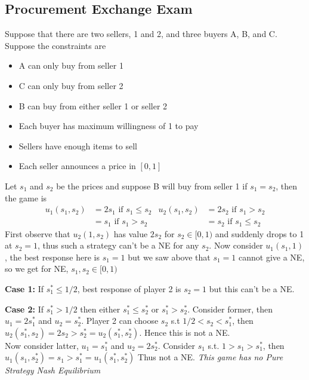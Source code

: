 \documentclass{article}
\theoremstyle{definition}
\begin{document}
\subsection{Procurement Exchange Exam}
Suppose that there are two sellers, 1 and 2, and three buyers A, B, and C. Suppose the constraints are
\begin{itemize}
	\item A can only buy from seller 1
	\item C can only buy from seller 2
	\item B can buy from either seller 1 or seller 2
	\item Each buyer has maximum willingness of 1 to pay
	\item Sellers have enough items to sell
	\item Each seller announces a price in $[0,1]$
\end{itemize}
Let $s_1$ and $s_2$ be the prices and suppose B will buy from seller 1 if $s_1 = s_2$, then the game is
\begin{align*}
u_1(s_1,s_2) &= 2s_1 \text{ if } s_1\leq s_2 & u_2(s_1,s_2) &= 2s_2 \text { if } s_1>s_2\\
&= s_1 \text{ if } s_1>s_2 &&= s_2 \text{ if } s_1\leq s_2
\end{align*}
First observe that $u_2(1,s_2)$ has value $2s_2$ for $s_2\in [0,1)$ and suddenly drops to 1 at $s_2 = 1$, thus such a strategy can't be a NE for any $s_2$. Now consider $u_1(s_1,1)$, the best response here is $s_1 = 1$ but we saw above that $s_1 = 1$ cannot give a NE, so we get for NE, $s_1, s_2 \in [0,1)$

\textbf{Case 1:} If $s_1^* \leq 1/2$, best response of player 2 is $s_2 = 1$ but this can't be a NE.

\textbf{Case 2:} If $s_1^* > 1/2$ then either $s_1^* \leq s_2^*$ or $s_1^* > s_2^*$. Consider former, then $u_1 = 2s_1^*$ and $u_2 = s_2^*$. Player 2 can choose $s_2$ s.t $1/2<s_2<s_1^*$, then $u_2(s_1^*, s_2) = 2s_2 > s_2^* = u_2(s_1^*, s_2^*)$. Hence this is not a NE.\\

Now consider latter, $u_1 = s_1^*$ and $u_2 = 2s_2^*$. Consider $s_1$ s.t. $1>s_1>s_1^*$, then $u_1(s_1, s_2^*) = s_1 > s_1^* = u_1(s_1^*, s_2^*)$ Thus not a NE. \textit{This game has no Pure Strategy Nash Equilibrium}
\end{document}
